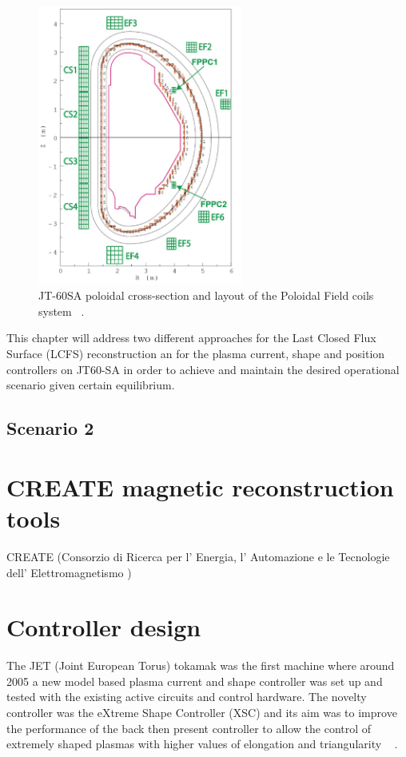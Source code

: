 \begin{figure}
	\centering
	\includegraphics[width=0.6\textwidth]{Chp3/JT60Coils.png}

	\caption{	\label{JT60coils}JT-60SA poloidal cross-section and layout of the Poloidal Field coils system ~\cite{NCruz}.}
\end{figure}

This chapter will address two different approaches for the Last Closed Flux Surface (LCFS) reconstruction an for the  plasma current, shape and position controllers on  JT60-SA in order to achieve and maintain the desired operational scenario given certain equilibrium. 

\subsection{Scenario 2}

\section{CREATE magnetic reconstruction tools}
CREATE (Consorzio di Ricerca per l' Energia, l' Automazione e le Tecnologie dell' Elettromagnetismo )

\section{Controller design}
The JET (Joint European Torus) tokamak was the first machine where around 2005 a new model based plasma current and shape controller was set up and tested  with the existing active circuits and control hardware. The novelty controller was the eXtreme Shape Controller (XSC) and its aim was to improve  the performance of the back then present controller to allow the control of extremely shaped plasmas with higher values of elongation and triangularity ~\cite{Albanese2005} . 
 
